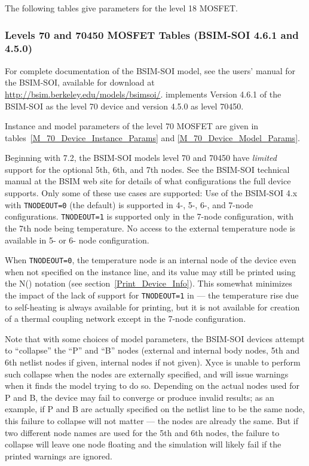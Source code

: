 The following tables give parameters for the level 18 MOSFET.




\clearpage
\subsubsection{Levels 70 and 70450 MOSFET Tables (BSIM-SOI 4.6.1 and 4.5.0)}
For complete documentation of the BSIM-SOI model, see the users'
manual for the BSIM-SOI, available for download at
\url{http://bsim.berkeley.edu/models/bsimsoi/}.  \Xyce{} implements
Version 4.6.1 of the BSIM-SOI as the level 70 device and version 4.5.0
as level 70450.

Instance and model parameters of the level 70 MOSFET are given in
tables~\ref{M_70_Device_Instance_Params} and
\ref{M_70_Device_Model_Params}.

Beginning with \Xyce{} 7.2, the BSIM-SOI models level 70 and 70450
have {\em limited} support for the optional 5th, 6th, and 7th nodes.
See the BSIM-SOI technical manual at the BSIM web site for details of
what configurations the full device supports.  Only some of these use
cases are supported: Use of the BSIM-SOI 4.x with \texttt{TNODEOUT=0}
(the default) is supported in 4-, 5-, 6-, and 7-node configurations.
\texttt{TNODEOUT=1} is supported only in the 7-node configuration,
with the 7th node being temperature.  No access to the external
temperature node is available in 5- or 6- node configuration.

When \texttt{TNODEOUT=0}, the temperature node is an internal node of
the device even when not specified on the instance line, and its value
may still be printed using the N() notation (see
section~\ref{Print_Device_Info}).  This somewhat minimizes the impact
of the lack of support for \texttt{TNODEOUT=1} in \Xyce{} --- the
temperature rise due to self-heating is always available for printing,
but it is not available for creation of a thermal coupling network
except in the 7-node configuration.

Note that with some choices of model parameters, the BSIM-SOI devices
attempt to ``collapse'' the ``P'' and ``B'' nodes (external and
internal body nodes, 5th and 6th netlist nodes if given, internal
nodes if not given).  Xyce is unable to perform such collapse when the
nodes are externally specified, and will issue warnings when it finds
the model trying to do so.  Depending on the actual nodes used for P
and B, the device may fail to converge or produce invalid results; as
an example, if P and B are actually specified on the netlist line to
be the same node, this failure to collapse will not matter --- the
nodes are already the same.  But if two different node names are used
for the 5th and 6th nodes, the failure to collapse will leave one node
floating and the simulation will likely fail if the printed warnings
are ignored.

